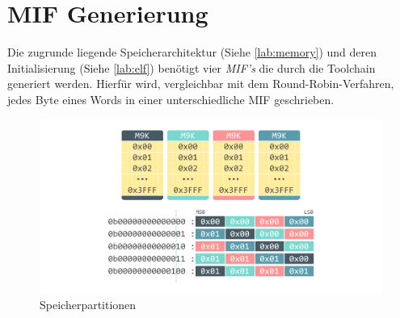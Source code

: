     \section{MIF Generierung}

        Die zugrunde liegende Speicherarchitektur (Siehe \ref{lab:memory})
        und deren Initialisierung (Siehe \ref{lab:elf}) benötigt vier \textit{MIF's}
        die durch die Toolchain generiert werden. Hierfür wird,
        vergleichbar mit dem Round-Robin-Verfahren, jedes Byte eines Words
        in einer unterschiedliche MIF geschrieben.

        \begin{figure}[H]
            \centering
            \includegraphics[scale=1]{img/memorypartition.pdf}
            \caption{Speicherpartitionen}
            \label{fig:memorypartition}
        \end{figure}
        
        
        
       